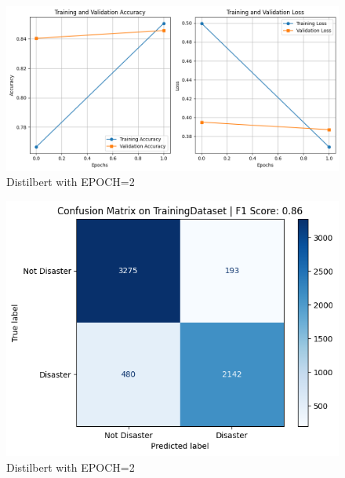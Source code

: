 \begin{figure}[H]
    \centering
    \includegraphics[scale=0.7]{figures/epoch2.png}
    \caption{Distilbert with EPOCH=2}
\end{figure}

\begin{figure}[H]
    \centering
    \includegraphics[scale=0.7]{figures/epoch2_training.png}
    \caption{Distilbert with EPOCH=2}
\end{figure}

